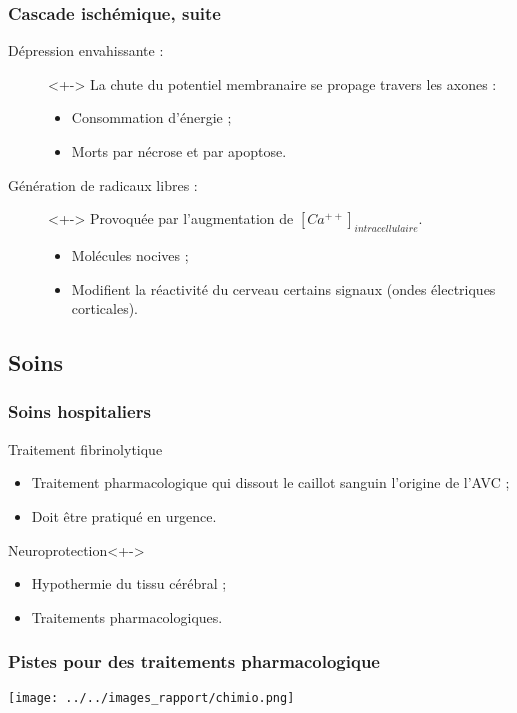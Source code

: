 \begin{frame}
\frametitle{Cascade isch\'emique, suite}
\begin{description}
\item[D\'epression envahissante :]<+-> La chute du potentiel membranaire se propage  travers les axones :
\begin{itemize}
\item<+-> Consommation d'\'energie ;
\item<+-> Morts par n\'ecrose et par apoptose.
\end{itemize}
%
\item[G\'en\'eration de radicaux libres :]<+-> Provoqu\'ee par l'augmentation de $[Ca^{++}]_{intracellulaire}$.
\begin{itemize}
\item<+-> Mol\'ecules nocives ;
\item<+-> Modifient la r\'eactivit\'e du cerveau  certains signaux (ondes \'electriques corticales).
\end{itemize}
\end{description}
\end{frame}

\subsection{Soins}

\begin{frame}
\frametitle{Soins hospitaliers}
\begin{block}{Traitement fibrinolytique}
\begin{itemize}
\item<+-> Traitement pharmacologique qui dissout le caillot sanguin  l'origine de l'AVC ;
\item<+-> Doit \^etre pratiqu\'e en urgence.
\end{itemize}
\end{block}
%
\begin{block}{Neuroprotection}<+->
\begin{itemize}
\item<+-> Hypothermie du tissu c\'er\'ebral ;
\item<+-> Traitements pharmacologiques.
\end{itemize}
\end{block}
\end{frame}

\begin{frame}
\frametitle{Pistes pour des traitements pharmacologique}

\texttt{[image: ../../images\_rapport/chimio.png]}
\end{frame}

